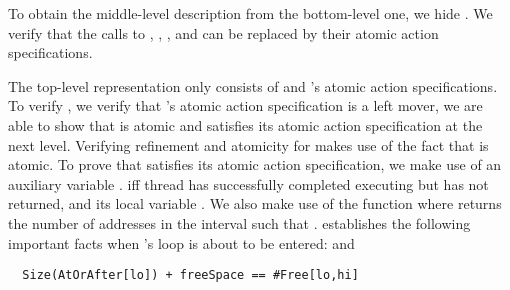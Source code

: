 To obtain the middle-level description from the bottom-level
  one, we hide . We verify that 
the calls to , ,
, and
 can be replaced by their atomic action
specifications. 

The top-level representation only
consists of  and 's atomic action
specifications. To verify , we verify that 's atomic
action specification is a left mover, we are able to show that  is
atomic and satisfies its atomic action specification at the next level. 
Verifying refinement and atomicity for  makes use
of the fact that  is atomic. To prove that 
satisfies its atomic action specification, we make use of an auxiliary
variable .  iff thread
 has successfully completed executing  but has
not returned, and its local variable . We also make use
of the function  where  returns the number
of addresses  in the interval \exC{[u,v]} such that
. 
establishes the following important facts when 's
 loop is about to be entered:  and 
\begin{verbatim}
  Size(AtOrAfter[lo]) + freeSpace == #Free[lo,hi] 
\end{verbatim}


